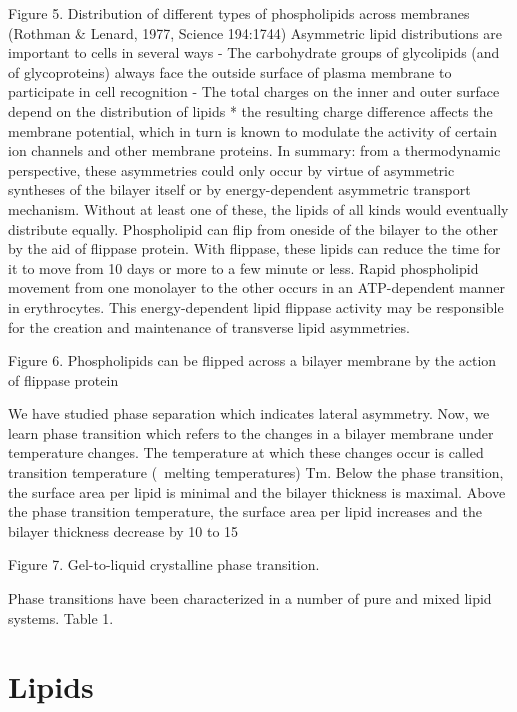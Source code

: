 Figure 5. Distribution of different types of phospholipids across membranes
(Rothman \& Lenard, 1977, Science 194:1744) Asymmetric lipid distributions are
important to cells in several ways  -  The carbohydrate groups of glycolipids
(and of glycoproteins) always face the outside surface of plasma membrane   to
participate in cell recognition  -  The total charges on the inner and outer
surface depend on the distribution of lipids * the resulting charge difference
affects the membrane potential, which in turn is known to modulate the activity
of certain ion channels and other membrane proteins.
In summary: from a thermodynamic perspective, these asymmetries could only occur
by virtue of asymmetric syntheses of the bilayer itself or by energy-dependent
asymmetric transport mechanism. Without at least one of these, the lipids of all
kinds would eventually distribute equally.
Phospholipid can flip from oneside of the bilayer to the other by the aid of
flippase protein. With flippase, these lipids can reduce the time for it to move
from 10 days or more to a few minute or less. Rapid phospholipid movement from
one monolayer to the other occurs in an ATP-dependent manner in erythrocytes.
This energy-dependent lipid flippase activity may be responsible for the
creation and maintenance of transverse lipid asymmetries.

Figure 6. Phospholipids can be flipped across a bilayer membrane by the action
of flippase protein

We have studied phase separation which indicates lateral asymmetry. Now, we
learn phase transition which refers to the changes in a bilayer membrane under
temperature changes. The temperature at which these changes occur is called
transition temperature (~melting temperatures) Tm. Below the phase transition,
the surface area per lipid is minimal and the bilayer thickness is maximal.
Above the phase transition temperature, the surface area per lipid increases and
the bilayer thickness decrease by 10 to 15%

Figure 7. Gel-to-liquid crystalline phase transition.

Phase transitions have been characterized in a number of pure and mixed lipid
systems.
Table 1.




\section{Lipids}
\label{sec:lipids}
\label{sec:fats}
\label{sec:fatty-acids}


